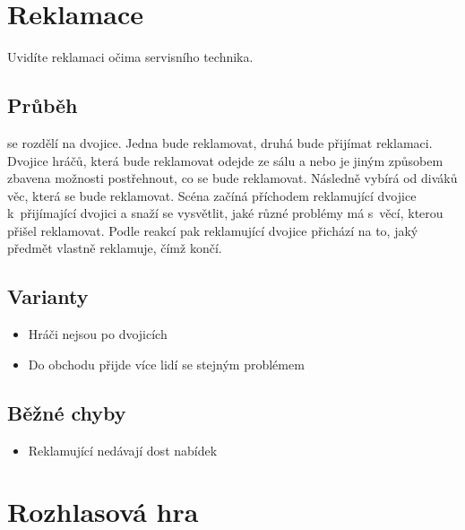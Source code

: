  
 
 
 
\needspace{5cm} \section{Reklamace} \label{reklamace}  
 
 
Uvidíte reklamaci očima servisního technika. 
 
 
\subsection{ Průběh }  se rozdělí na dvojice. Jedna bude reklamovat, druhá bude přijímat reklamaci. Dvojice hráčů, která bude reklamovat odejde ze sálu a nebo je jiným způsobem zbavena možnosti postřehnout, co se bude reklamovat. Následně  vybírá od diváků věc, která se bude reklamovat. Scéna začíná příchodem reklamující dvojice k~přijímající dvojici a snaží se vysvětlit, jaké různé problémy má s~věcí, kterou přišel reklamovat. Podle reakcí pak reklamující dvojice přichází na to, jaký předmět vlastně reklamuje, čímž  končí. 
 
\subsection{ Varianty } \begin{itemize}
\item  Hráči nejsou po dvojicích
\item  Do obchodu přijde více lidí se stejným problémem
\end{itemize}
 
\subsection{ Běžné chyby } \begin{itemize}
\item  Reklamující nedávají dost nabídek
\end{itemize}
 
 
 
 
 
\needspace{5cm} \section{Rozhlasová hra} \label{rozhlasová hra}  
 
